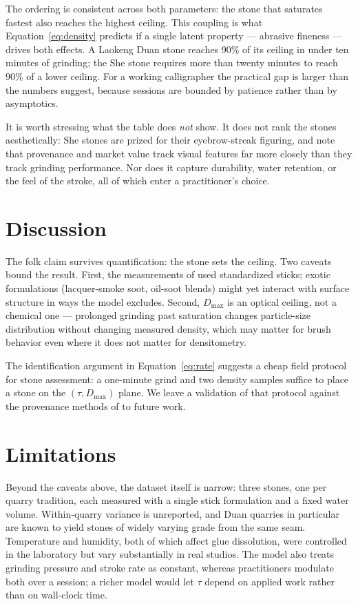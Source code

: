 \documentclass[letterpaper]{article} %
\begin{document}
The ordering is consistent across both parameters: the stone that
saturates fastest also reaches the highest ceiling. This coupling is
what Equation~\ref{eq:density} predicts if a single latent property ---
abrasive fineness --- drives both effects. A Laokeng Duan stone
reaches 90\% of its ceiling in under ten minutes of grinding; the She
stone requires more than twenty minutes to reach 90\% of a lower
ceiling. For a working calligrapher the practical gap is larger than
the numbers suggest, because sessions are bounded by patience rather
than by asymptotics.

It is worth stressing what the table does \emph{not} show. It does not
rank the stones aesthetically: She stones are prized for their
eyebrow-streak figuring, and \citet{chen2021} note that provenance and
market value track visual features far more closely than they track
grinding performance. Nor does it capture durability, water retention,
or the feel of the stroke, all of which enter a practitioner's choice.

\section{Discussion}

The folk claim survives quantification: the stone sets the ceiling.
Two caveats bound the result. First, the measurements of
\citet{tanaka2019} used standardized sticks; exotic formulations
(lacquer-smoke soot, oil-soot blends) might yet interact with surface
structure in ways the model excludes. Second, $D_{\max}$ is an optical
ceiling, not a chemical one --- prolonged grinding past saturation
changes particle-size distribution without changing measured density,
which may matter for brush behavior even where it does not matter for
densitometry.

The identification argument in Equation~\ref{eq:rate} suggests a cheap
field protocol for stone assessment: a one-minute grind and two
density samples suffice to place a stone on the
$(\tau, D_{\max})$ plane. We leave a validation of that protocol
against the provenance methods of \citet{chen2021} to future work.

\section{Limitations}

Beyond the caveats above, the dataset itself is narrow: three stones,
one per quarry tradition, each measured with a single stick formulation
and a fixed water volume. Within-quarry variance is unreported, and
Duan quarries in particular are known to yield stones of widely varying
grade from the same seam. Temperature and humidity, both of which
affect glue dissolution, were controlled in the laboratory but vary
substantially in real studios. The model also treats grinding pressure
and stroke rate as constant, whereas practitioners modulate both over a
session; a richer model would let $\tau$ depend on applied work rather
than on wall-clock time.
\end{document}
